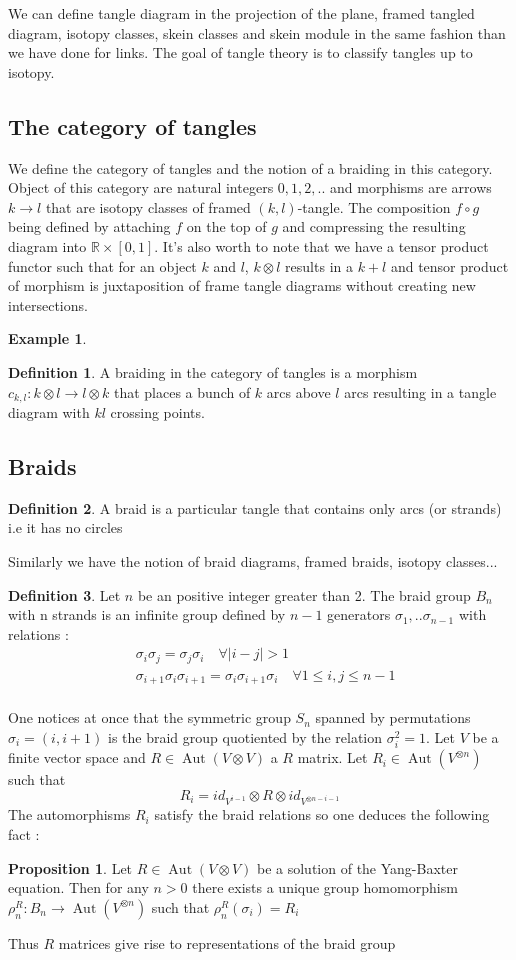 \documentclass{article}
\DeclareMathOperator{\aut}{Aut}
\theoremstyle{definition}
\newtheorem{Prop}{Proposition}[section]
\newtheorem{ex}{Example}[section]
\newtheorem{Def}{Definition}[section]
\begin{document}
We can define tangle diagram in the projection of the plane, framed tangled diagram, isotopy classes, skein classes and skein module in the same fashion than we have done for links. The goal of tangle theory is to classify tangles up to isotopy.
\subsection{The category of tangles} We define the category of tangles and the notion of a braiding in this category. Object of this category are natural integers $0,1,2,..$ and morphisms are arrows $k\to l $ that are isotopy classes of framed $(k,l)$-tangle. The composition $f\circ g$ being defined by attaching $f$ on the top of $g$ and compressing the resulting diagram into $\mathbb{R}\times [0,1]$. It's also worth to note that we have a tensor product functor such that for an object $k$ and $l$, $k\otimes l$ results in a $k+l$ and tensor product of morphism is juxtaposition of frame tangle diagrams without creating new intersections.
\begin{ex}
\vspace{10cm}
\end{ex}
\begin{Def} A braiding in the category of tangles is a morphism $c_{k,l}:k\otimes l \to l\otimes k$ that places a bunch of $k$ arcs above $l$ arcs resulting in a tangle diagram with $kl$  crossing points.
\end{Def}
\subsection{Braids}
\begin{Def}
A braid  is a particular tangle  that contains only arcs (or strands) i.e it has no circles
\end{Def} 
Similarly we have the notion of braid diagrams, framed braids, isotopy classes... 
\begin{Def} Let $n$ be an positive integer greater than 2. The braid group $B_n$ with n strands is an infinite group defined by $n-1$ generators $\sigma_1,..\sigma_{n-1}$ with relations : \begin{align*}
&\sigma_i\sigma_j=\sigma_j\sigma_i\quad\forall|i-j|>1\\
&\sigma_{i+1}\sigma_i\sigma_{i+1}=\sigma_{i}\sigma_{i+1}\sigma_{i}\quad\forall 1\leq i,j\leq n-1 \\
\end{align*}
\end{Def}
One notices at once that the symmetric group $S_n$ spanned by permutations $\sigma_i=(i,i+1)$ is the braid group quotiented by the relation $\sigma_i^{2}=1$. Let $V$ be a finite vector space and $R\in\aut(V\otimes V)$ a $R$ matrix. Let $R_i\in\aut(V^{\otimes n })$ such that $$R_i=id_{V^{i-1}}\otimes R\otimes id_{V^{\otimes n-i-1}}$$
The automorphisms $R_i$ satisfy the braid relations so one deduces the following fact : \begin{Prop} Let $R\in\aut(V\otimes V)$ be a solution of the Yang-Baxter equation. Then for any $n>0$ there exists a unique group homomorphism $\rho_n^{R}:B_n\to \aut(V^{\otimes n})$ such that $\rho_n^{R}(\sigma_i)=R_i$
\end{Prop}
Thus $R$ matrices give rise to representations of the braid group
\end{document}
